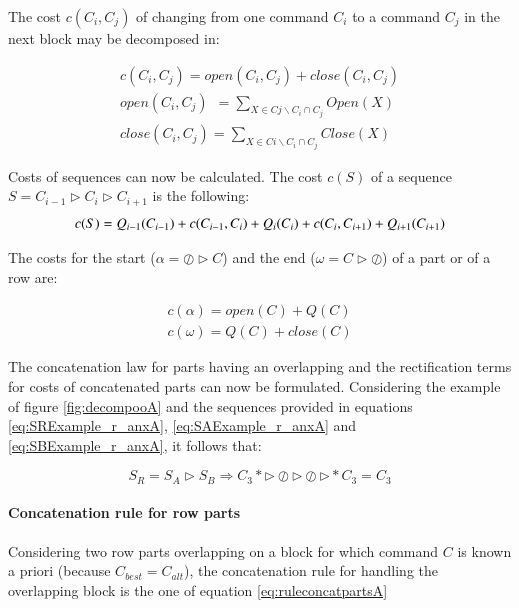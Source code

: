 The cost $c(C_i,C_j)$ of changing from one command $C_i$ to a command $C_j$ in the next block may be decomposed in:

\begin{eqnarray*}
	c(C_i,C_j)=open(C_i,C_j)+close(C_i,C_j)\\
	open(C_i,C_j)\ \ = \sum\limits_{X \in Cj\backslash C_i \cap C_j} Open(X) \\
	close(C_i,C_j) = \sum\limits_{X \in Ci\backslash C_i \cap C_j} Close(X)
\end{eqnarray*}

Costs of sequences can now be calculated. The cost $c(S)$ of a sequence $S= C_{i-1} \triangleright C_i \triangleright C_{i+1}$ is the following: 
\begin{equation}
	c(S)=Q_{i-1}(C_{i-1})+c(C_{i-1},C_i)+Q_i(C_i)+c(C_i,C_{i+1})\\+Q_{i+1}(C_{i+1})
\end{equation}

The costs for the start ($\alpha = \oslash \triangleright C$) and the end ($\omega = C \triangleright \oslash$) of a part or of a row are:

\begin{eqnarray}
	c(\alpha) = open(C) + Q(C) \label{eq:costalphaA}
	\\
	c(\omega) = Q(C) + close(C) \label{eq:costomegaA}
\end{eqnarray}

The concatenation law for parts having an overlapping and the rectification terms for costs of concatenated parts can now be formulated. Considering the example of figure \ref{fig:decompooA} and the sequences provided in equations \ref{eq:SRExample_r_anxA}, \ref{eq:SAExample_r_anxA} and \ref{eq:SBExample_r_anxA}, it follows that:

\begin{equation}
	S_R = S_A \triangleright S_B \Rightarrow C_{3}* \triangleright \oslash \triangleright \oslash \triangleright *C_{3} = C_{3} \label{eq:concatparts_anxA}
\end{equation}

\paragraph{Concatenation rule for row parts} Considering two row parts overlapping on a block for which command $C$ is known a priori (because $C_{best}=C_{alt}$), the concatenation rule for handling the overlapping block is the one of equation \ref{eq:ruleconcatpartsA}

